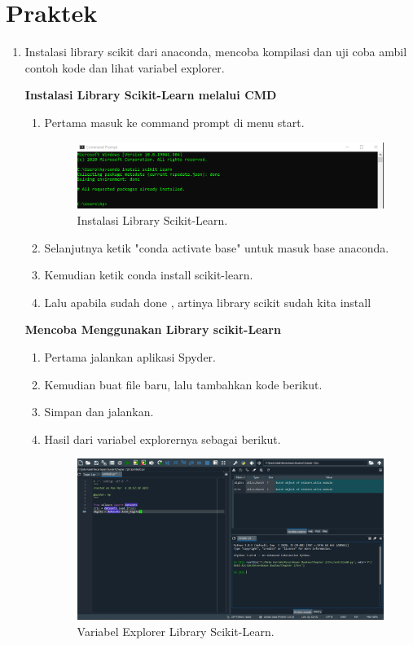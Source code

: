 \section{Praktek}
\begin{enumerate}
	\item Instalasi  library  scikit  dari  anaconda,  mencoba  kompilasi  dan  uji  coba  ambil contoh kode dan lihat variabel explorer.
	
	\textbf{Instalasi Library Scikit-Learn melalui CMD }
	\begin{enumerate}
		\item Pertama masuk ke command prompt di menu start.
		\begin{figure}[H]
			\includegraphics[width=1\textwidth]{figures/chapter1/praktek/1.PNG}
			\centering
			\caption{Instalasi Library Scikit-Learn.}
		\end{figure}
		\item Selanjutnya ketik "conda activate base" untuk masuk base anaconda.
		\item Kemudian ketik conda install scikit-learn.
		\item Lalu apabila sudah done , artinya library scikit sudah kita install
	\end{enumerate}

	\textbf{Mencoba Menggunakan Library scikit-Learn}
	\begin{enumerate}
		\item Pertama jalankan aplikasi Spyder.
		\item Kemudian buat file baru, lalu tambahkan kode berikut.
		
		\item Simpan dan jalankan.
		\item Hasil dari variabel explorernya sebagai berikut.
		\begin{figure}[H]
			\includegraphics[width=1\textwidth]{figures/chapter1/praktek/contoh.PNG}
			\centering
			\caption{Variabel Explorer Library Scikit-Learn.}
		\end{figure}
	\end{enumerate}
	

\end{enumerate}
